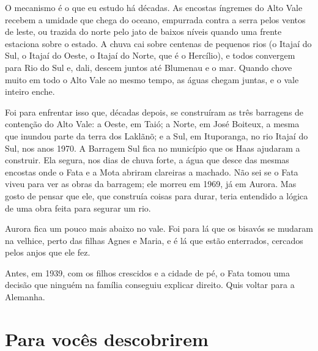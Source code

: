 \documentclass[
  brazilian,
  11pt,
  openany]{book}
\begin{document}
O mecanismo é o que eu estudo há décadas. As encostas íngremes do Alto
Vale recebem a umidade que chega do oceano, empurrada contra a serra
pelos ventos de leste, ou trazida do norte pelo jato de baixos níveis
quando uma frente estaciona sobre o estado. A chuva cai sobre centenas
de pequenos rios (o Itajaí do Sul, o Itajaí do Oeste, o Itajaí do Norte,
que é o Hercílio), e todos convergem para Rio do Sul e, dali, descem
juntos até Blumenau e o mar. Quando chove muito em todo o Alto Vale ao
mesmo tempo, as águas chegam juntas, e o vale inteiro enche.

Foi para enfrentar isso que, décadas depois, se construíram as três
barragens de contenção do Alto Vale: a Oeste, em Taió; a Norte, em José
Boiteux, a mesma que inundou parte da terra dos Laklãnõ; e a Sul, em
Ituporanga, no rio Itajaí do Sul, nos anos 1970. A Barragem Sul fica no
município que os Haas ajudaram a construir. Ela segura, nos dias de
chuva forte, a água que desce das mesmas encostas onde o Fata e a Mota
abriram clareiras a machado. Não sei se o Fata viveu para ver as obras
da barragem; ele morreu em 1969, já em Aurora. Mas gosto de pensar que
ele, que construía coisas para durar, teria entendido a lógica de uma
obra feita para segurar um rio.

Aurora fica um pouco mais abaixo no vale. Foi para lá que os bisavós se
mudaram na velhice, perto das filhas Agnes e Maria, e é lá que estão
enterrados, cercados pelos anjos que ele fez.

Antes, em 1939, com os filhos crescidos e a cidade de pé, o Fata tomou
uma decisão que ninguém na família conseguiu explicar direito. Quis
voltar para a Alemanha.

\section{Para vocês descobrirem}\label{para-vocuxeas-descobrirem-5}
\end{document}
